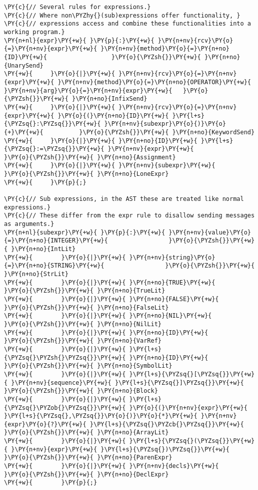 \begin{Verbatim}[commandchars=\\\{\}]
\PY{c}{// Several rules for expressions.}
\PY{c}{// Where non\PYZhy{}(sub)expressions offer functionality, }
\PY{c}{// expressions access and combine these functionalities into a working program.}
\PY{n+nl}{expr}\PY{+w}{ }\PY{p}{:}\PY{+w}{ }\PY{n+nv}{rcv}\PY{o}{=}\PY{n+nv}{expr}\PY{+w}{ }\PY{n+nv}{method}\PY{o}{=}\PY{n+no}{ID}\PY{+w}{                  }\PY{o}{\PYZsh{}}\PY{+w}{ }\PY{n+no}{UnarySend}
\PY{+w}{     }\PY{o}{|}\PY{+w}{ }\PY{n+nv}{rcv}\PY{o}{=}\PY{n+nv}{expr}\PY{+w}{ }\PY{n+nv}{method}\PY{o}{=}\PY{n+no}{OPERATOR}\PY{+w}{ }\PY{n+nv}{arg}\PY{o}{=}\PY{n+nv}{expr}\PY{+w}{   }\PY{o}{\PYZsh{}}\PY{+w}{ }\PY{n+no}{InfixSend}
\PY{+w}{     }\PY{o}{|}\PY{+w}{ }\PY{n+nv}{rcv}\PY{o}{=}\PY{n+nv}{expr}\PY{+w}{ }\PY{o}{(}\PY{n+no}{ID}\PY{+w}{ }\PY{l+s}{\PYZsq{}:\PYZsq{}}\PY{+w}{ }\PY{n+nv}{subexpr}\PY{o}{)}\PY{o}{+}\PY{+w}{          }\PY{o}{\PYZsh{}}\PY{+w}{ }\PY{n+no}{KeywordSend}
\PY{+w}{     }\PY{o}{|}\PY{+w}{ }\PY{n+no}{ID}\PY{+w}{ }\PY{l+s}{\PYZsq{}:=\PYZsq{}}\PY{+w}{ }\PY{n+nv}{expr}\PY{+w}{                        }\PY{o}{\PYZsh{}}\PY{+w}{ }\PY{n+no}{Assignment}
\PY{+w}{     }\PY{o}{|}\PY{+w}{ }\PY{n+nv}{subexpr}\PY{+w}{                             }\PY{o}{\PYZsh{}}\PY{+w}{ }\PY{n+no}{LoneExpr}
\PY{+w}{     }\PY{p}{;}

\PY{c}{// Sub expressions, in the AST these are treated like normal expressions.}
\PY{c}{// These differ from the expr rule to disallow sending messages as arguments.}
\PY{n+nl}{subexpr}\PY{+w}{ }\PY{p}{:}\PY{+w}{ }\PY{n+nv}{value}\PY{o}{=}\PY{n+no}{INTEGER}\PY{+w}{                 }\PY{o}{\PYZsh{}}\PY{+w}{ }\PY{n+no}{IntLit}
\PY{+w}{        }\PY{o}{|}\PY{+w}{ }\PY{n+nv}{string}\PY{o}{=}\PY{n+no}{STRING}\PY{+w}{                 }\PY{o}{\PYZsh{}}\PY{+w}{ }\PY{n+no}{StrLit}
\PY{+w}{        }\PY{o}{|}\PY{+w}{ }\PY{n+no}{TRUE}\PY{+w}{                          }\PY{o}{\PYZsh{}}\PY{+w}{ }\PY{n+no}{TrueLit}
\PY{+w}{        }\PY{o}{|}\PY{+w}{ }\PY{n+no}{FALSE}\PY{+w}{                         }\PY{o}{\PYZsh{}}\PY{+w}{ }\PY{n+no}{FalseLit}
\PY{+w}{        }\PY{o}{|}\PY{+w}{ }\PY{n+no}{NIL}\PY{+w}{                           }\PY{o}{\PYZsh{}}\PY{+w}{ }\PY{n+no}{NilLit}
\PY{+w}{        }\PY{o}{|}\PY{+w}{ }\PY{n+no}{ID}\PY{+w}{                            }\PY{o}{\PYZsh{}}\PY{+w}{ }\PY{n+no}{VarRef}
\PY{+w}{        }\PY{o}{|}\PY{+w}{ }\PY{l+s}{\PYZsq{}\PYZsh{}\PYZsq{}}\PY{+w}{ }\PY{n+no}{ID}\PY{+w}{                        }\PY{o}{\PYZsh{}}\PY{+w}{ }\PY{n+no}{SymbolLit}
\PY{+w}{        }\PY{o}{|}\PY{+w}{ }\PY{l+s}{\PYZsq{}[\PYZsq{}}\PY{+w}{ }\PY{n+nv}{sequence}\PY{+w}{ }\PY{l+s}{\PYZsq{}]\PYZsq{}}\PY{+w}{              }\PY{o}{\PYZsh{}}\PY{+w}{ }\PY{n+no}{Block}
\PY{+w}{        }\PY{o}{|}\PY{+w}{ }\PY{l+s}{\PYZsq{}\PYZob{}\PYZsq{}}\PY{+w}{ }\PY{o}{(}\PY{n+nv}{expr}\PY{+w}{ }\PY{l+s}{\PYZsq{},\PYZsq{}}\PY{o}{)}\PY{o}{*}\PY{+w}{ }\PY{n+nv}{expr}\PY{o}{?}\PY{+w}{ }\PY{l+s}{\PYZsq{}\PYZcb{}\PYZsq{}}\PY{+w}{     }\PY{o}{\PYZsh{}}\PY{+w}{ }\PY{n+no}{ArrayLit}
\PY{+w}{        }\PY{o}{|}\PY{+w}{ }\PY{l+s}{\PYZsq{}(\PYZsq{}}\PY{+w}{ }\PY{n+nv}{expr}\PY{+w}{ }\PY{l+s}{\PYZsq{})\PYZsq{}}\PY{+w}{                  }\PY{o}{\PYZsh{}}\PY{+w}{ }\PY{n+no}{ParenExpr}
\PY{+w}{        }\PY{o}{|}\PY{+w}{ }\PY{n+nv}{decls}\PY{+w}{                         }\PY{o}{\PYZsh{}}\PY{+w}{ }\PY{n+no}{DeclExpr}
\PY{+w}{        }\PY{p}{;}


\end{Verbatim}
